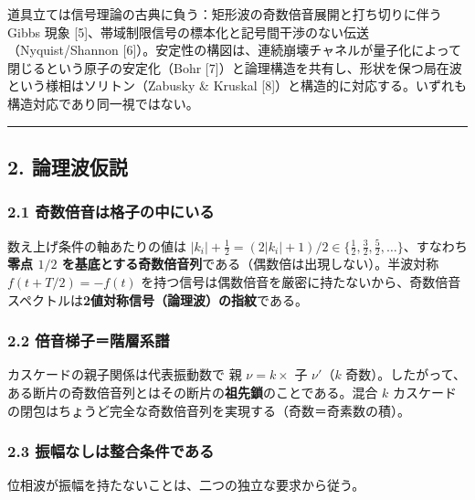 \documentclass[
]{ltjsarticle}
\begin{document}
道具立ては信号理論の古典に負う：矩形波の奇数倍音展開と打ち切りに伴う
Gibbs 現象
{[}5{]}、帯域制限信号の標本化と記号間干渉のない伝送（Nyquist/Shannon
{[}6{]}）。安定性の構図は、連続崩壊チャネルが量子化によって閉じるという原子の安定化（Bohr
{[}7{]}）と論理構造を共有し、形状を保つ局在波という様相はソリトン（Zabusky
\& Kruskal
{[}8{]}）と構造的に対応する。いずれも構造対応であり同一視ではない。

\begin{center}\rule{0.5\linewidth}{0.5pt}\end{center}

\subsection{2. 論理波仮説}\label{ux8ad6ux7406ux6ce2ux4eeeux8aac}

\subsubsection{2.1
奇数倍音は格子の中にいる}\label{ux5947ux6570ux500dux97f3ux306fux683cux5b50ux306eux4e2dux306bux3044ux308b}

数え上げ条件の軸あたりの値は
\(|k_i|+\tfrac12=(2|k_i|+1)/2\in\{\tfrac12,\tfrac32,\tfrac52,\ldots\}\)、すなわち\textbf{零点
\(1/2\) を基底とする奇数倍音列}である（偶数倍は出現しない）。半波対称
\(f(t+T/2)=-f(t)\)
を持つ信号は偶数倍音を厳密に持たないから、奇数倍音スペクトルは\textbf{2値対称信号（論理波）の指紋}である。

\subsubsection{2.2
倍音梯子＝階層系譜}\label{ux500dux97f3ux68afux5b50ux968eux5c64ux7cfbux8b5c}

カスケードの親子関係は代表振動数で 親 \(\nu=k\times\) 子 \(\nu'\)（\(k\)
奇数）。したがって、ある断片の奇数倍音列とはその断片の\textbf{祖先鎖}のことである。混合
\(k\)
カスケードの閉包はちょうど完全な奇数倍音列を実現する（奇数＝奇素数の積）。

\subsubsection{2.3
振幅なしは整合条件である}\label{ux632fux5e45ux306aux3057ux306fux6574ux5408ux6761ux4ef6ux3067ux3042ux308b}

位相波が振幅を持たないことは、二つの独立な要求から従う。
\end{document}

